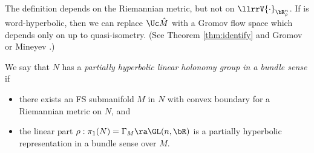 The definition depends on the Riemannian metric, but not on $\llrrV{\cdot}_{\bR^n_{\rho}}$. If  is word-hyperbolic, then we can replace $\Uc \hat M$ with a Gromov flow space which depends only on  up to quasi-isometry. (See Theorem \ref{thm:identify} and Gromov \cite{Gromov87} or Mineyev \cite{Mineyev}.)


We say that $N$ has a \emph{partially hyperbolic linear holonomy group in 
a bundle sense} if
\begin{itemize}
\item there exists an FS submanifold $M$ in $N$ with convex boundary for a Riemannian metric on $N$, and
\item the linear part $\rho: \pi_1(N) = \Gamma_{M} \ra \GL(n, \bR)$ is a partially hyperbolic representation in a bundle sense over $M$. 
\end{itemize}





